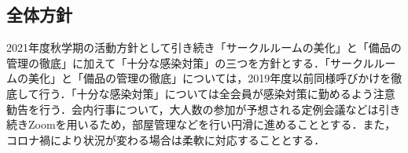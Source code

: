 \subsection*{全体方針}


2021年度秋学期の活動方針として引き続き「サークルルームの美化」と「備品の管理の徹底」に加えて「十分な感染対策」の三つを方針とする．「サークルルームの美化」と「備品の管理の徹底」については，2019年度以前同様呼びかけを徹底して行う．「十分な感染対策」については全会員が感染対策に勤めるよう注意勧告を行う．会内行事について，大人数の参加が予想される定例会議などは引き続きZoomを用いるため，部屋管理などを行い円滑に進めることとする．また，コロナ禍により状況が変わる場合は柔軟に対応することとする．
